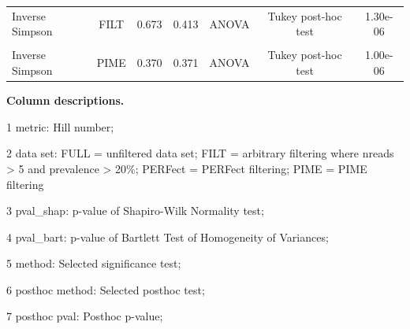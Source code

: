 \documentclass[
  10pt,
  letterpaper,
  DIV=11,
  numbers=noendperiod]{scrartcl}
\begin{document}
\begin{table}[H]
\begin{threeparttable}
\begin{tabular}[t]{lccclcc}
Inverse Simpson & FILT & 0.673 & 0.413 & ANOVA & Tukey post-hoc test & 1.30e-06\\
\cellcolor{gray!6}{Inverse Simpson} & \cellcolor{gray!6}{PERFect} & \cellcolor{gray!6}{0.747} & \cellcolor{gray!6}{0.348} & \cellcolor{gray!6}{ANOVA} & \cellcolor{gray!6}{Tukey post-hoc test} & \cellcolor{gray!6}{3.20e-06}\\
Inverse Simpson & PIME & 0.370 & 0.371 & ANOVA & Tukey post-hoc test & 1.00e-06\\
\bottomrule
\end{tabular}
\begin{tablenotes}[para]
\item \textbf{Column descriptions. } 
\item 
\item[1] metric: Hill number; 
\item[2] data set: FULL = unfiltered data set; FILT = arbitrary filtering where nreads > 5 and prevalence > 20\%; PERFect = PERFect filtering; PIME = PIME filtering
\item[3] pval\_shap: p-value of Shapiro-Wilk Normality test; 
\item[4] pval\_bart: p-value of Bartlett Test of Homogeneity of Variances; 
\item[5] method: Selected significance test; 
\item[6] posthoc method: Selected posthoc test; 
\item[7] posthoc pval: Posthoc p-value; 
\end{tablenotes}
\end{threeparttable}
\end{table}

\newpage{}
\end{document}

